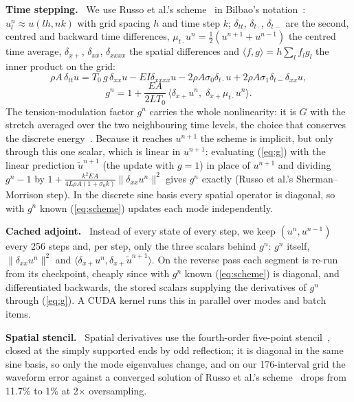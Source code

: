 \documentclass[a4paper]{article}
\newcommand{\head}[1]{\par\vspace{2pt}\noindent\textbf{#1.}\ \ignorespaces}
\begin{document}
\begin{sloppy}
\head{Time stepping}
We use Russo et al.'s scheme~\cite{russo2026} in Bilbao's
notation~\cite{bilbao2009}: $u^n_l\approx u(lh,nk)$ with grid spacing $h$ and
time step $k$; $\delta_{tt}$, $\delta_{t\cdot}$, $\delta_{t-}$ are the second,
centred and backward time differences, $\mu_{t\cdot}u^n=\tfrac12(u^{n+1}+u^{n-1})$
the centred time average, $\delta_{x+}$, $\delta_{xx}$, $\delta_{xxxx}$ the
spatial differences and $\langle f,g\rangle=h\sum_lf_lg_l$ the inner product on
the grid:
\begin{equation}
\rho A\,\delta_{tt}u=T_0\,g\,\delta_{xx}u-EI\delta_{xxxx}u
 -2\rho A\sigma_0\delta_{t\cdot}u+2\rho A\sigma_1\delta_{t-}\delta_{xx}u,
\label{eq:scheme}
\end{equation}
\begin{equation}
g^n=1+\frac{EA}{2LT_0}\,\big\langle\delta_{x+}u^n,\;\delta_{x+}\mu_{t\cdot}u^n\big\rangle.
\label{eq:g}
\end{equation}
The tension-modulation factor $g^n$ carries the whole nonlinearity: it is $G$
with the stretch averaged over the two neighbouring time levels, the choice that
conserves the discrete energy~\cite{bilbao2009}. Because it reaches $u^{n+1}$
the scheme is implicit, but only through this one scalar, which is linear in
$u^{n+1}$: evaluating (\ref{eq:g}) with the linear prediction $\tilde u^{n+1}$
(the update with $g=1$) in place of $u^{n+1}$ and dividing $g^n-1$ by
$1+\frac{k^2EA}{4L\rho A(1+\sigma_0k)}\|\delta_{xx}u^n\|^2$ gives $g^n$ exactly
(Russo et al.'s Sherman--Morrison step). In the discrete sine basis every spatial
operator is diagonal, so with $g^n$ known (\ref{eq:scheme}) updates each mode
independently.

\head{Cached adjoint}
Instead of every state of every step, we keep $(u^n,u^{n-1})$ every 256 steps
and, per step, only the three scalars behind $g^n$: $g^n$ itself,
$\|\delta_{xx}u^n\|^2$ and $\langle\delta_{x+}u^n,\delta_{x+}\tilde u^{n+1}\rangle$.
On the reverse pass each segment is re-run from its checkpoint, cheaply since
with $g^n$ known (\ref{eq:scheme}) is diagonal, and differentiated backwards,
the stored scalars supplying the derivatives of $g^n$ through (\ref{eq:g}). A
CUDA kernel runs this in parallel over modes and batch items.

\head{Spatial stencil}
Spatial derivatives use the fourth-order five-point
stencil~\cite{bilbao2009}, closed at the simply supported ends by odd
reflection; it is diagonal in the same sine basis, so only the mode
eigenvalues change, and on our 176-interval grid the waveform error against
a converged solution of Russo et al.'s scheme~\cite{russo2026} drops from
11.7\% to 1\% at 2$\times$ oversampling.


\end{sloppy}
\end{document}
